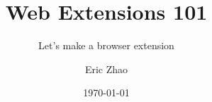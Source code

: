 \documentclass[xcolor={dvipsnames},xtable]{beamer}
\title{Web Extensions 101}
\subtitle{Let's make a browser extension}
\date{\today}
\author{Eric Zhao}
\begin{document}

\newcommand{\sectiontitle}{}
\newcommand{\currenttitle}{}

\maketitle

\newcommand{\subdir}{sections}
\newcommand{\emojisubdir}{emojisub}
\newcommand{\templatedir}{template}





\end{document}
